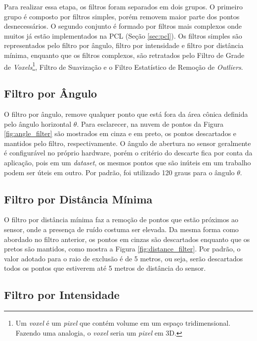 Para realizar essa etapa, os filtros foram separados em dois grupos.
O primeiro grupo é composto por filtros simples, porém removem maior parte dos pontos desnecessários. 
O segundo conjunto é formado por filtros mais complexos onde muitos já estão implementados na PCL (Seção \ref{sec:pcl}).
Os filtros simples são representados pelo filtro por ângulo, filtro por intensidade e filtro por distância mínima, enquanto que os filtros complexos, são retratados pelo Filtro de Grade de \textit{Voxels}\footnote{Um \textit{voxel} é um \textit{pixel} que contém volume em um espaço tridimensional. Fazendo uma analogia, o \textit{voxel} seria um \textit{pixel} em 3D.}, Filtro de Suavização e o Filtro Estatístico de Remoção de \textit{Outliers}.

\subsection{Filtro por Ângulo}
\label{sec:angle_filter}

O filtro por ângulo, remove qualquer ponto que está fora da área cônica definida pelo ângulo horizontal $\theta$. Para esclarecer, na nuvem de pontos da Figura \ref{fig:angle_filter} são mostrados em cinza e em preto, os pontos descartados e mantidos pelo filtro, respectivamente.
O ângulo de abertura no sensor geralmente é configurável no próprio hardware, porém o critério do descarte fica por conta da aplicação, pois em um \textit{dataset}, os mesmos pontos que são inúteis em um trabalho podem ser úteis em outro. 
Por padrão, foi utilizado 120 graus para o ângulo $\theta$.

\subsection{Filtro por Distância Mínima}
\label{sec:distance_filter}

O filtro por distância mínima faz a remoção de pontos que estão próximos ao sensor, onde a presença de ruído costuma ser elevada. Da mesma forma como abordado no filtro anterior, os pontos em cinzas são descartados enquanto que os pretos são mantidos, como mostra a Figura \ref{fig:distance_filter}. Por padrão, o valor adotado para o raio de exclusão é de 5 metros, ou seja, serão descartados todos os pontos que estiverem até 5 metros de distância do sensor.

\subsection{Filtro por Intensidade}
\label{sec:intensity_filter}

